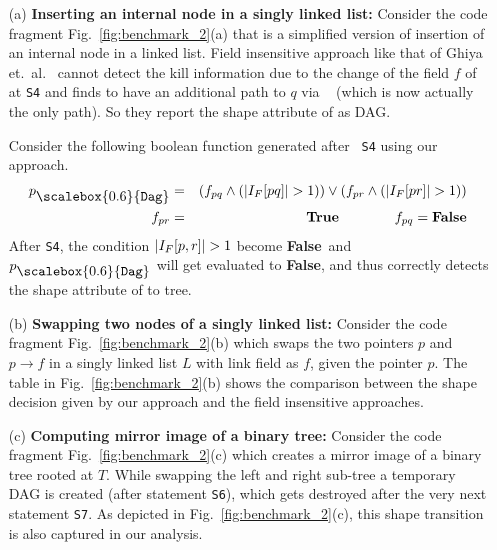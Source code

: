 \documentclass[letterpaper]{sig-alternate}
\newcommand{\q}{\ensuremath{q}}
\newcommand{\subD}{\mbox{\scalebox{0.6}{\Dag}}}
\newcommand{\num}[1]{\ensuremath{|#1|}}
\newcommand{\Dag}{{\tt Dag}}
\newcommand{\false}{\textbf{False}}
\newcommand{\true}{\textbf{True}}
\begin{document}
\begin{itemize}
\item[(a)] {\bf Inserting an internal node in a singly linked
  list: }
Consider the code fragment Fig.~\ref{fig:benchmark_2}(a) that
is a simplified version of insertion of an internal node in a
linked list. Field insensitive approach like that of Ghiya
et.~al.~\cite{Ghiya96} cannot detect the kill information due
to the change of the field $f$ of {\tt \on} at {\tt S4} and
finds {\tt \on} to have an additional path to $\q$ via {\tt
  \nn} (which is now actually the only path). So they report
the shape attribute of {\tt \on} as DAG.

Consider the following boolean function generated after {\tt
  S4} using our approach.
\begin{eqnarray*}
  \on_{\subD} &=&   (f_{\on\q} \wedge (\num{I_F[\on\q]} > 1)) 
  \vee  (f_{\on\nn} \wedge (\num{I_F[\on\nn]} > 1)) \\
  f_{\on\nn} &=& \true \qquad\qquad  f_{\on\q} = \false
\end{eqnarray*}
After {\tt S4}, the condition $\num{I_F[\on,\nn]} > 1$ become
\false\ and $\on_{\subD}$ will get evaluated to \false, and
thus correctly detects the shape attribute of {\tt \on} to
tree.
\item[(b)] {\bf Swapping two nodes of a singly linked list: }
Consider the code fragment Fig.~\ref{fig:benchmark_2}(b)
which swaps the two pointers $p$ and $p\rightarrow f$ in a
singly linked list $L$ with link field as $f$, given the
pointer $p$. The table in Fig.~\ref{fig:benchmark_2}(b) shows the
comparison between the shape decision given by our approach
and the field insensitive approaches.
\item [(c)]{\bf Computing mirror image of a binary tree: }
Consider the code fragment Fig.~\ref{fig:benchmark_2}(c)
which creates a mirror image of a binary tree rooted at
$T$. While swapping the left and right sub-tree a temporary
DAG is created (after statement {\tt S6}), which gets
destroyed after the very next statement {\tt S7}. As depicted
in Fig.~\ref{fig:benchmark_2}(c), this shape transition is also
captured in our analysis.
\end{itemize}
\end{document}
